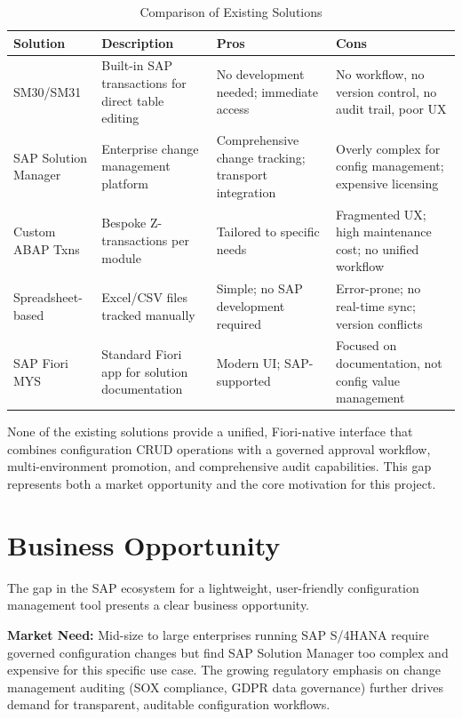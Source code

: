 \documentclass[12pt,a4paper]{report}
\begin{document}
\begin{table}[H]
\centering\small
\begin{tabularx}{\textwidth}{|l|X|X|X|}
  \hline
  \rowcolor{tableheadpeach}
  \textbf{Solution} & \textbf{Description} & \textbf{Pros} & \textbf{Cons} \\ \hline
  SM30/SM31 &
    Built-in SAP transactions for direct table editing &
    No development needed; immediate access &
    No workflow, no version control, no audit trail, poor UX \\ \hline
  SAP Solution Manager &
    Enterprise change management platform &
    Comprehensive change tracking; transport integration &
    Overly complex for config management; expensive licensing \\ \hline
  Custom ABAP Txns &
    Bespoke Z-transactions per module &
    Tailored to specific needs &
    Fragmented UX; high maintenance cost; no unified workflow \\ \hline
  Spreadsheet-based &
    Excel/CSV files tracked manually &
    Simple; no SAP development required &
    Error-prone; no real-time sync; version conflicts \\ \hline
  SAP Fiori MYS &
    Standard Fiori app for solution documentation &
    Modern UI; SAP-supported &
    Focused on documentation, not config value management \\ \hline
\end{tabularx}
\caption{Comparison of Existing Solutions}
\label{tab:existing-solutions}
\end{table}

None of the existing solutions provide a unified, Fiori-native interface that combines configuration CRUD operations with a governed approval workflow, multi-environment promotion, and comprehensive audit capabilities. This gap represents both a market opportunity and the core motivation for this project.


\section{Business Opportunity}

The gap in the SAP ecosystem for a lightweight, user-friendly configuration management tool presents a clear business opportunity.

\textbf{Market Need:} Mid-size to large enterprises running SAP S/4HANA require governed configuration changes but find SAP Solution Manager too complex and expensive for this specific use case. The growing regulatory emphasis on change management auditing (SOX compliance, GDPR data governance) further drives demand for transparent, auditable configuration workflows.
\end{document}
